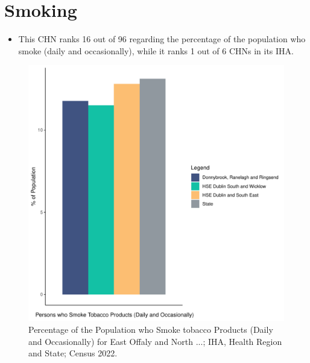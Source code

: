 \documentclass{article}
\begin{document}
\pagebreak

\section{Smoking}\label{sect:Smoking}
\begin{itemize}
\item This CHN ranks  16 out of 96 regarding the percentage of the population who smoke (daily and occasionally), while it ranks   1 out of 6 CHNs in its IHA.
\end{itemize}
\begin{figure}[H]
	\centering
	\includegraphics[width = 120mm]{../figures/SmokingED.pdf}
	\caption{Percentage of the Population who Smoke tobacco Products (Daily and Occasionally) for East Offaly and North ...; IHA, Health Region and State; Census 2022.}
	\label{fig:2ae19629-1a6a-13a3-e055-000000000001}
	\end{figure}
	
\end{document}
